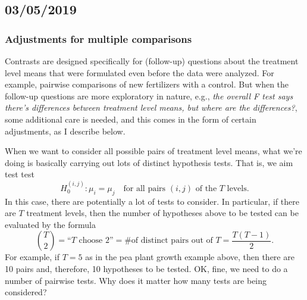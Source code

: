 \documentclass[a4paper, 12pt]{article}
\theoremstyle{plain}
\theoremstyle{definition}
\theoremstyle{remark}
\begin{document}
\subsection*{03/05/2019}

\subsubsection*{Adjustments for multiple comparisons}

Contrasts are designed specifically for (follow-up) questions about the treatment level means that were formulated even before the data were analyzed.  For example, pairwise comparisons of new fertilizers with a control.  But when the follow-up questions are more exploratory in nature, e.g., {\em the overall F test says there's differences between treatment level means, but where are the differences?}, some additional care is needed, and this comes in the form of certain adjustments, as I describe below.  

When we want to consider all possible pairs of treatment level means, what we're doing is basically carrying out lots of distinct hypothesis tests.  That is, we aim test test 
\[ H_0^{(i,j)}: \mu_i = \mu_j \quad \text{for all pairs $(i,j)$ of the $T$ levels}. \]
In this case, there are potentially a lot of tests to consider.  In particular, if there are $T$ treatment levels, then the number of hypotheses above to be tested can be evaluated by the formula 
\[ \binom{T}{2} = \text{``$T$ choose 2''} = \text{\# of distinct pairs out of $T$} = \frac{T(T-1)}{2}. \]
For example, if $T=5$ as in the pea plant growth example above, then there are 10 pairs and, therefore, 10 hypotheses to be tested.  OK, fine, we need to do a number of pairwise tests.  Why does it matter how many tests are being considered?
\end{document}
